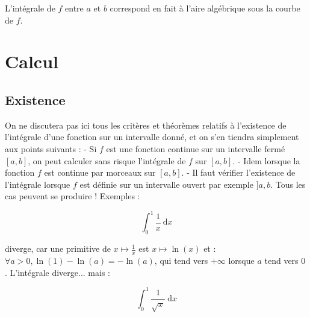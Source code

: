 L'intégrale de $f$ entre $a$ et $b$ correspond en fait à l'aire algébrique sous la courbe de $f$.


\section{Calcul}

\subsection{Existence}
On ne discutera pas ici tous les critères et théorèmes relatifs à l'existence de l'intégrale d'une fonction sur un intervalle donné, et on s'en tiendra simplement aux points suivants :
- Si $f$ est une fonction continue sur un intervalle fermé $[a, b]$, on peut calculer sans risque l'intégrale de $f$ sur $[a, b]$.
- Idem lorsque la fonction $f$ est continue par morceaux sur $[a, b]$.
- Il faut vérifier l'existence de l'intégrale lorsque $f$ est définie sur un intervalle ouvert par exemple $] a, b$. Tous les cas peuvent se produire ! Exemples :

$$
\int_0^1 \frac{1}{x} \mathrm{~d} x
$$

diverge, car une primitive de $x \mapsto \frac{1}{x}$ est $x \mapsto \ln (x)$ et : $\forall a>0, \ln (1)-\ln (a)=-\ln (a)$, qui tend vers $+\infty$ lorsque $a$ tend vers 0 . L'intégrale diverge... mais :

$$
\int_0^1 \frac{1}{\sqrt{x}} \mathrm{~d} x
$$

